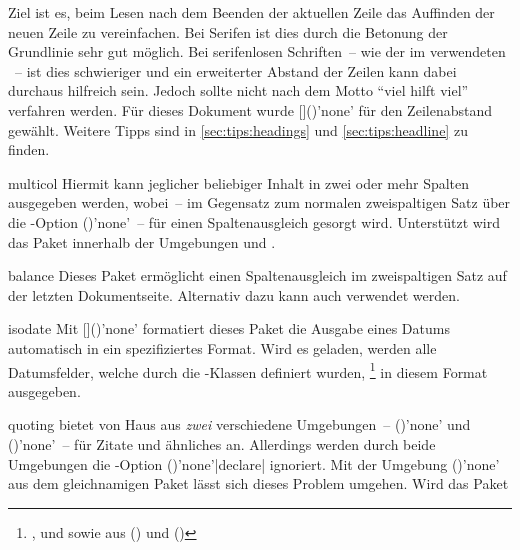 \begin{packages}
  Ziel ist es, beim Lesen nach dem Beenden der aktuellen Zeile das Auffinden 
  der neuen Zeile zu vereinfachen. Bei Serifen ist dies durch die Betonung der 
  Grundlinie sehr gut möglich. Bei serifenlosen Schriften~-- wie der im \TUDCD 
  verwendeten \Univers~-- ist dies schwieriger und ein erweiterter Abstand der 
  Zeilen kann dabei durchaus hilfreich sein. Jedoch sollte nicht nach dem Motto 
  \enquote{viel hilft viel} verfahren werden. Für dieses Dokument wurde 
  []()'none' für den 
  Zeilenabstand gewählt. Weitere Tipps sind in \autoref{sec:tips:headings} und 
  \autoref{sec:tips:headline} zu finden.
\item[multicol]
  Hiermit kann jeglicher beliebiger Inhalt in zwei oder mehr Spalten ausgegeben 
  werden, wobei~-- im Gegensatz zum normalen zweispaltigen Satz über die
  \KOMAScript-Option ()'none'~-- für einen 
  Spaltenausgleich gesorgt wird. Unterstützt wird das Paket innerhalb der 
  Umgebungen  und .
\item[balance]
  Dieses Paket ermöglicht einen Spaltenausgleich im zweispaltigen Satz auf der 
  letzten Dokumentseite. Alternativ dazu kann auch  verwendet 
  werden.
\item[isodate]
  Mit []()'none' formatiert 
  dieses Paket die Ausgabe eines Datums automatisch in ein spezifiziertes 
  Format. Wird es geladen, werden alle Datumsfelder, welche durch die 
  \TUDScript-Klassen definiert wurden,%
  \footnote{%
    ,  und  sowie aus 
     () und 
    ()%
  }
  in diesem Format ausgegeben.
\item[quoting]
   bietet von Haus aus \emph{zwei} verschiedene Umgebungen~-- 
  ()'none' und 
  ()'none'~-- für Zitate und 
  ähnliches an. Allerdings werden durch beide Umgebungen die \KOMAScript-Option 
  ()'none'|declare|
  ignoriert. Mit der Umgebung ()'none'
  aus dem gleichnamigen Paket lässt sich dieses Problem umgehen. Wird das Paket 

\end{packages}
